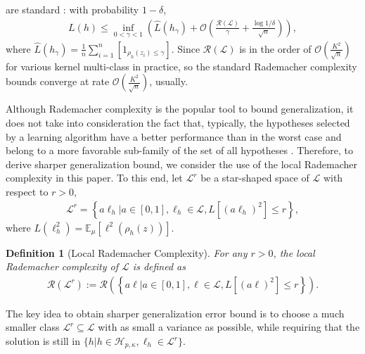 \documentclass{article}
\newtheorem{definition}{Definition}
\begin{document}
are standard \cite{koltchinskii2002empirical,koltchinskii2001some,mohri2012foundations}:
with probability $1-\delta$,
\begin{align*}
  L(h)\leq \inf_{0<\gamma<1}\left(\hat{L}(h_\gamma)+\mathcal{O}\left(\frac{\mathcal{R}(\mathcal{L})}{\gamma}+\frac{\log1/\delta}{\sqrt{n}}\right)\right),
\end{align*}
where $\hat{L}(h_\gamma)=\frac{1}{n}\sum_{i=1}^n\left[1_{\rho_h(z_i)\leq \gamma}\right]$.
Since $\mathcal{R}(\mathcal{L})$ is in the order of $\mathcal{O}(\frac{K^2}{\sqrt{n}})$ for various  kernel multi-class in practice,
so the standard Rademacher complexity bounds converge at rate
$\mathcal{O}\left(\frac{K^2}{\sqrt{n}}\right)$, usually.

Although Rademacher complexity is the popular tool to bound generalization,
it does not take into consideration the fact that,
typically, the hypotheses selected by a learning algorithm
have a better performance than in the worst case and
belong to a more favorable sub-family of the set of all hypotheses \cite{cortes2013learning}.
Therefore, to derive sharper generalization bound,
we consider the use of the local Rademacher complexity in this paper.
To this end,
  let $\mathcal{L}^r$ be a star-shaped space of $\mathcal{L}$ with respect to $r>0$,
  \begin{align}
  \label{def-localrademchercomplexity}
    \mathcal{L}^r=\left\{
        a\ell_h\Big|a\in[0,1],\ell_h\in\mathcal{L},
        L[(a\ell_h)^2]\leq r
    \right\},
  \end{align}
 where $L(\ell_h^2)=\mathbb{E}_\mu\left[\ell^2(\rho_h(z))\right]$.
 \begin{definition}[Local Rademacher Complexity]
 \label{def-thereee}
   For any $r>0$, the local Rademacher complexity of $\mathcal{L}$ is defined as
   \begin{align*}
     \mathcal{R}(\mathcal{L}^r):=
     \mathcal{R}\left(\left\{
        a\ell\Big|a\in[0,1],\ell\in\mathcal{L},
        L[(a\ell)^2]\leq r\right\}\right).
   \end{align*}
 \end{definition}
 The key idea to obtain sharper generalization error bound
 is to choose a much smaller class $\mathcal{L}^r\subseteq\mathcal{L}$
 with as small a variance as possible,
 while requiring that the solution is still in $\{h|h\in\mathcal{H}_{p,\kappa},\ell_h\in \mathcal{L}^r\}$.
\end{document}
